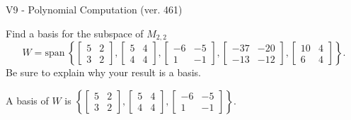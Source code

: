 \begin{exercise}
  \begin{exerciseTitle}V9 - Polynomial Computation (ver. 461)\end{exerciseTitle}
  \begin{exerciseStatement}
    Find a basis for the subspace of \(M_{2,2}\) 
\[W=\mathrm{span}\ \left\{\left[\begin{array}{cc}
5 & 2 \\
3 & 2
\end{array}\right] , \left[\begin{array}{cc}
5 & 4 \\
4 & 4
\end{array}\right] , \left[\begin{array}{cc}
-6 & -5 \\
1 & -1
\end{array}\right] , \left[\begin{array}{cc}
-37 & -20 \\
-13 & -12
\end{array}\right] , \left[\begin{array}{cc}
10 & 4 \\
6 & 4
\end{array}\right]\right\}.\]
 Be sure to explain why your result is a basis.


  \end{exerciseStatement}
  \begin{exerciseAnswer}
   A basis of \(W\) is  \(\left\{\left[\begin{array}{cc}
5 & 2 \\
3 & 2
\end{array}\right] , \left[\begin{array}{cc}
5 & 4 \\
4 & 4
\end{array}\right] , \left[\begin{array}{cc}
-6 & -5 \\
1 & -1
\end{array}\right]\right\}\).
  


  \end{exerciseAnswer}
\end{exercise}